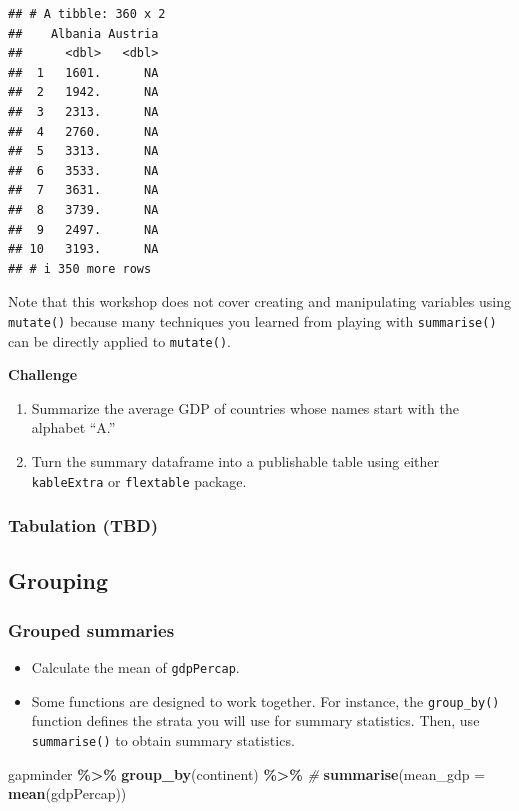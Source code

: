 \documentclass[
]{book}
\newenvironment{Shaded}{\begin{snugshade}}{\end{snugshade}}
\newcommand{\AttributeTok}[1]{\textcolor[rgb]{0.13,0.29,0.53}{#1}}
\newcommand{\CommentTok}[1]{\textcolor[rgb]{0.56,0.35,0.01}{\textit{#1}}}
\newcommand{\FunctionTok}[1]{\textcolor[rgb]{0.13,0.29,0.53}{\textbf{#1}}}
\newcommand{\NormalTok}[1]{#1}
\newcommand{\SpecialCharTok}[1]{\textcolor[rgb]{0.81,0.36,0.00}{\textbf{#1}}}
\begin{document}
\begin{verbatim}
## # A tibble: 360 x 2
##    Albania Austria
##      <dbl>   <dbl>
##  1   1601.      NA
##  2   1942.      NA
##  3   2313.      NA
##  4   2760.      NA
##  5   3313.      NA
##  6   3533.      NA
##  7   3631.      NA
##  8   3739.      NA
##  9   2497.      NA
## 10   3193.      NA
## # i 350 more rows
\end{verbatim}

Note that this workshop does not cover creating and manipulating variables using \texttt{mutate()} because many techniques you learned from playing with \texttt{summarise()} can be directly applied to \texttt{mutate()}.

\textbf{Challenge}

\begin{enumerate}
\def\labelenumi{\arabic{enumi}.}
\item
  Summarize the average GDP of countries whose names start with the alphabet ``A.''
\item
  Turn the summary dataframe into a publishable table using either \texttt{kableExtra} or \texttt{flextable} package.
\end{enumerate}

\subsubsection{Tabulation (TBD)}\label{tabulation-tbd}

\subsection{Grouping}\label{grouping}

\subsubsection{Grouped summaries}\label{grouped-summaries}

\begin{itemize}
\item
  Calculate the mean of \texttt{gdpPercap}.
\item
  Some functions are designed to work together. For instance, the \texttt{group\_by()} function defines the strata you will use for summary statistics. Then, use \texttt{summarise()} to obtain summary statistics.
\end{itemize}

\begin{Shaded}
\begin{Highlighting}[]
\NormalTok{gapminder }\SpecialCharTok{\%\textgreater{}\%}
  \FunctionTok{group\_by}\NormalTok{(continent) }\SpecialCharTok{\%\textgreater{}\%} \CommentTok{\#}
  \FunctionTok{summarise}\NormalTok{(}\AttributeTok{mean\_gdp =} \FunctionTok{mean}\NormalTok{(gdpPercap))}
\end{Highlighting}
\end{Shaded}
\end{document}
